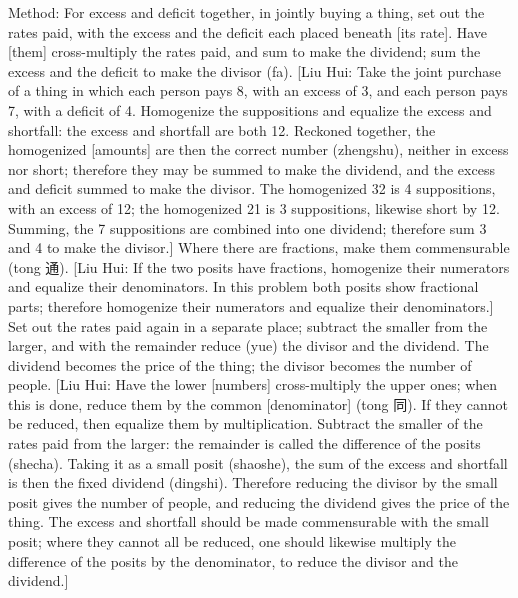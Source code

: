 \documentclass[11pt]{article}
\newenvironment{uniten}{\par\small\color{black!85}}{\par\medskip}
\begin{document}
\begin{uniten}Method: For excess and deficit together, in jointly buying a thing, set out the rates paid, with the excess and the deficit each placed beneath [its rate]. Have [them] cross-multiply the rates paid, and sum to make the dividend; sum the excess and the deficit to make the divisor (fa). [Liu Hui: Take the joint purchase of a thing in which each person pays 8, with an excess of 3, and each person pays 7, with a deficit of 4. Homogenize the suppositions and equalize the excess and shortfall: the excess and shortfall are both 12. Reckoned together, the homogenized [amounts] are then the correct number (zhengshu), neither in excess nor short; therefore they may be summed to make the dividend, and the excess and deficit summed to make the divisor. The homogenized 32 is 4 suppositions, with an excess of 12; the homogenized 21 is 3 suppositions, likewise short by 12. Summing, the 7 suppositions are combined into one dividend; therefore sum 3 and 4 to make the divisor.] Where there are fractions, make them commensurable (tong 通). [Liu Hui: If the two posits have fractions, homogenize their numerators and equalize their denominators. In this problem both posits show fractional parts; therefore homogenize their numerators and equalize their denominators.] Set out the rates paid again in a separate place; subtract the smaller from the larger, and with the remainder reduce (yue) the divisor and the dividend. The dividend becomes the price of the thing; the divisor becomes the number of people. [Liu Hui: Have the lower [numbers] cross-multiply the upper ones; when this is done, reduce them by the common [denominator] (tong 同). If they cannot be reduced, then equalize them by multiplication. Subtract the smaller of the rates paid from the larger: the remainder is called the difference of the posits (shecha). Taking it as a small posit (shaoshe), the sum of the excess and shortfall is then the fixed dividend (dingshi). Therefore reducing the divisor by the small posit gives the number of people, and reducing the dividend gives the price of the thing. The excess and shortfall should be made commensurable with the small posit; where they cannot all be reduced, one should likewise multiply the difference of the posits by the denominator, to reduce the divisor and the dividend.]\end{uniten}
\end{document}
